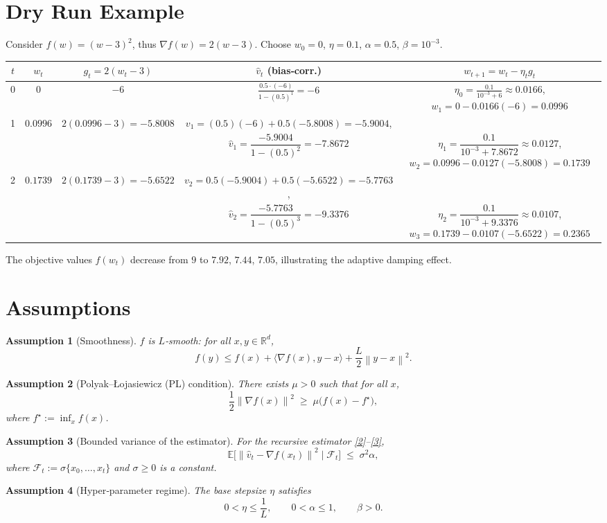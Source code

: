 \documentclass{article}
\newtheorem{assumption}{Assumption}
\newcommand{\E}{\mathbb{E}}
\newcommand{\norm}[1]{\left\|#1\right\|}
\newcommand{\ip}[2]{\langle #1,#2\rangle}
\begin{document}
\section*{Dry Run Example}
Consider $f(w)=(w-3)^2$, thus $\nabla f(w)=2(w-3)$.  
Choose $w_0=0$, $\eta=0.1$, $\alpha=0.5$, $\beta=10^{-3}$.

\begin{center}
\begin{tabular}{c|c|c|c|c}
$t$ & $w_t$ & $g_t=2(w_t-3)$ & $\hat v_t$ (bias‑corr.) & $w_{t+1}=w_t-\eta_t g_t$\\\hline
0 & $0$ & $-6$ &
$\displaystyle\frac{0.5\cdot(-6)}{1-(0.5)^{1}} = -6$ &
$\eta_0=\frac{0.1}{10^{-3}+6}\approx 0.0166$, $w_1=0-0.0166(-6)=0.0996$\\\hline
1 & $0.0996$ & $2(0.0996-3)=-5.8008$ &
$v_1=(0.5)(-6)+0.5(-5.8008)=-5.9004$,\\
  & & & $\hat v_1=\dfrac{-5.9004}{1-(0.5)^2}= -7.8672$ &
$\eta_1=\dfrac{0.1}{10^{-3}+7.8672}\approx0.0127$, $w_2=0.0996-0.0127(-5.8008)=0.1739$\\\hline
2 & $0.1739$ & $2(0.1739-3)=-5.6522$ &
$v_2=0.5(-5.9004)+0.5(-5.6522)=-5.7763$,\\
  & & & $\hat v_2=\dfrac{-5.7763}{1-(0.5)^3}= -9.3376$ &
$\eta_2=\dfrac{0.1}{10^{-3}+9.3376}\approx0.0107$, $w_3=0.1739-0.0107(-5.6522)=0.2365$\\
\end{tabular}
\end{center}
The objective values $f(w_t)$ decrease from $9$ to $7.92$, $7.44$, $7.05$, illustrating the adaptive damping effect.

\newpage
\section*{Assumptions}
\begin{assumption}[Smoothness]\label{ass:smooth}
$f$ is $L$‑smooth: for all $x,y\in\mathbb{R}^d$,
\[
    f(y)\le f(x)+\ip{\nabla f(x)}{y-x}+\frac{L}{2}\norm{y-x}^2 .
\]
\end{assumption}
\begin{assumption}[Polyak–Łojasiewicz (PL) condition]\label{ass:pl}
There exists $\mu>0$ such that for all $x$,
\[
    \frac{1}{2}\norm{\nabla f(x)}^2 \;\ge\; \mu\bigl(f(x)-f^\star\bigr),
\]
where $f^\star:=\inf_x f(x)$.
\end{assumption}
\begin{assumption}[Bounded variance of the estimator]\label{ass:var}
For the recursive estimator \eqref{2}–\eqref{3},
\[
    \E\!\bigl[\norm{ \hat v_t - \nabla f(x_t)}^2 \mid \mathcal{F}_t \bigr]
    \;\le\; \sigma^2 \alpha ,
\]
where $\mathcal{F}_t:=\sigma\{x_0,\dots,x_t\}$ and $\sigma\ge0$ is a constant.
\end{assumption}
\begin{assumption}[Hyper‑parameter regime]\label{ass:params}
The base stepsize $\eta$ satisfies
\[
    0<\eta\le \frac{1}{L},
\qquad
0<\alpha\le 1,
\qquad
\beta>0.
\]
\end{assumption}
\end{document}
